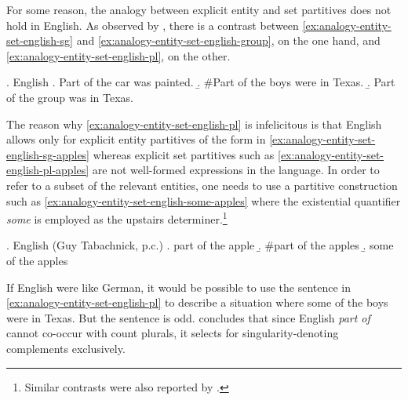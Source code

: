 For some reason, the analogy between explicit entity and set partitives does not hold in English. As observed by \citet[pp. 165--166]{schwarzschild1996pluralities}, there is a contrast between \ref{ex:analogy-entity-set-english-sg} and \ref{ex:analogy-entity-set-english-group}, on the one hand, and \ref{ex:analogy-entity-set-english-pl}, on the other. 

\ex. English \citep{schwarzschild1996pluralities}\label{ex:analogy-entity-set-english-schwarzschild}
\a. Part of the car was painted.\label{ex:analogy-entity-set-english-sg}
\b. \#Part of the boys were in Texas.\label{ex:analogy-entity-set-english-pl}
\b. Part of the group was in Texas.\label{ex:analogy-entity-set-english-group}

The reason why \ref{ex:analogy-entity-set-english-pl} is infelicitous is that English allows only for explicit entity partitives of the form in \ref{ex:analogy-entity-set-english-sg-apples} whereas explicit set partitives such as \ref{ex:analogy-entity-set-english-pl-apples} are not well-formed expressions in the language. In order to refer to a subset of the relevant entities, one needs to use a partitive construction such as \ref{ex:analogy-entity-set-english-some-apples} where the existential quantifier \textit{some} is employed as the upstairs determiner.\footnote{Similar contrasts were also reported by \citet{chierchia2010mass}.} 

\ex.\label{ex:analogy-entity-set-english} English (Guy Tabachnick, p.c.)
\a. part of the apple\label{ex:analogy-entity-set-english-sg-apples}
\b. \#part of the apples\label{ex:analogy-entity-set-english-pl-apples}
\b. some of the apples\label{ex:analogy-entity-set-english-some-apples}

If English were like German, it would be possible to use the sentence in \ref{ex:analogy-entity-set-english-pl} to describe a situation where some of the boys were in Texas. But the sentence is odd. \citeauthor{schwarzschild1996pluralities} concludes that since English \textit{part of} cannot co-occur with count plurals, it selects for singularity-denoting complements exclusively.\largerpage

